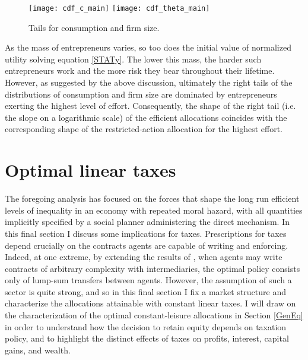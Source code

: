 \documentclass[11pt]{article}
\theoremstyle{plain}
\begin{document}
\begin{figure}[!htb]
\centering
\texttt{[image: cdf\_c\_main]}
\texttt{[image: cdf\_theta\_main]}
\caption{Tails for consumption and firm size.}\label{fig:tails_dist}
\end{figure}

As the mass of entrepreneurs varies, so too does the initial value of normalized utility solving equation \eqref{STATy}. The lower this mass, the harder such entrepreneurs work and the more risk they bear throughout their lifetime. However, as suggested by the above discussion, ultimately the right tails of the distributions of consumption and firm size are dominated by entrepreneurs exerting the highest level of effort. Consequently, the shape of the right tail (i.e. the slope on a logarithmic scale) of the efficient allocations coincides with the corresponding shape of the restricted-action allocation for the highest effort.  

\section{Optimal linear taxes} \label{Imp}

The foregoing analysis has focused on the forces that shape the long run efficient levels of inequality in an economy with repeated moral hazard, with all quantities implicitly specified by a social planner administering the direct mechanism. In this final section I discuss some implications for taxes. Prescriptions for taxes depend crucially on the contracts agents are capable of writing and enforcing. Indeed, at one extreme, by extending the results of \cite{atkeson_efficient_1992}, when agents may write contracts of arbitrary complexity with intermediaries, the optimal policy consists only of lump-sum transfers between agents. However, the assumption of such a sector is quite strong, and so in this final section I fix a market structure and characterize the allocations attainable with constant linear taxes. I will draw on the characterization of the optimal constant-leisure allocations in Section \ref{GenEq} in order to understand how the decision to retain equity depends on taxation policy, and to highlight the distinct effects of taxes on profits, interest, capital gains, and wealth. 
\end{document}
